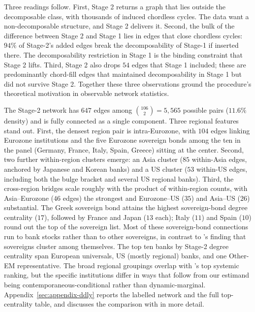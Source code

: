 Three readings follow. First, Stage 2 returns a graph that lies outside the decomposable class, with thousands of induced chordless cycles. The data want a non-decomposable structure, and Stage 2 delivers it. Second, the bulk of the difference between Stage 2 and Stage 1 lies in edges that close chordless cycles: $94\%$ of Stage-2's added edges break the decomposability of Stage-1 if inserted there. The decomposability restriction in Stage 1 is the binding constraint that Stage 2 lifts. Third, Stage 2 also drops $54$ edges that Stage 1 included; these are predominantly chord-fill edges that maintained decomposability in Stage 1 but did not survive Stage 2. Together these three observations ground the procedure's theoretical motivation in observable network statistics.

The Stage-2 network has $647$ edges among $\binom{106}{2} = 5{,}565$ possible pairs ($11.6\%$ density) and is fully connected as a single component. Three regional features stand out. First, the densest region pair is intra-Eurozone, with $104$ edges linking Eurozone institutions and the five Eurozone sovereign bonds among the ten in the panel (Germany, France, Italy, Spain, Greece) sitting at the center. Second, two further within-region clusters emerge: an Asia cluster ($85$ within-Asia edges, anchored by Japanese and Korean banks) and a US cluster ($53$ within-US edges, including both the bulge bracket and several US regional banks). Third, the cross-region bridges scale roughly with the product of within-region counts, with Asia--Eurozone ($46$ edges) the strongest and Eurozone--US ($35$) and Asia--US ($26$) substantial. The Greek sovereign bond attains the highest sovereign-bond degree centrality ($17$), followed by France and Japan ($13$ each); Italy ($11$) and Spain ($10$) round out the top of the sovereign list. Most of these sovereign-bond connections run to bank stocks rather than to other sovereigns, in contrast to \textcite{demirer2018estimating}'s finding that sovereigns cluster among themselves. The top ten banks by Stage-2 degree centrality span European universals, US (mostly regional) banks, and one Other-EM representative. The broad regional groupings overlap with \textcite{demirer2018estimating}'s top systemic ranking, but the specific institutions differ in ways that follow from our estimand being contemporaneous-conditional rather than dynamic-marginal. Appendix~\ref{sec:appendix-ddly} reports the labelled network and the full top-centrality table, and discusses the comparison with \textcite{demirer2018estimating} in more detail.
